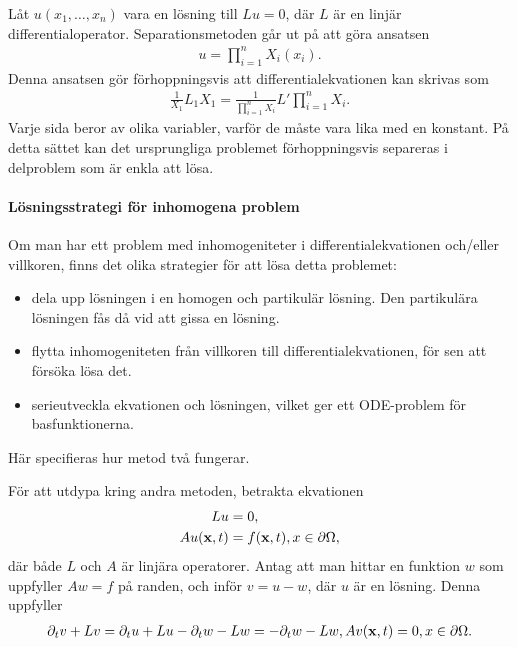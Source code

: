 Låt $u(x_{1}, \dots, x_{n})$ vara en lösning till $Lu = 0$, där $L$ är en linjär differentialoperator. Separationsmetoden går ut på att göra ansatsen
\begin{align*}
	u = \prod\limits_{i = 1}^{n}X_{i}(x_{i}).
\end{align*}
Denna ansatsen gör förhoppningsvis att differentialekvationen kan skrivas som
\begin{align*}
	\frac{1}{X_{1}}L_{1}X_{1} = \frac{1}{\prod\limits_{i = 1}^{n}X_{i}}L'\prod\limits_{i = 1}^{n}X_{i}.
\end{align*}
Varje sida beror av olika variabler, varför de måste vara lika med en konstant. På detta sättet kan det ursprungliga problemet förhoppningsvis separeras i delproblem som är enkla att lösa.

\paragraph{Lösningsstrategi för inhomogena problem}
Om man har ett problem med inhomogeniteter i differentialekvationen och/eller villkoren, finns det olika strategier för att lösa detta problemet:
\begin{itemize}
	\item dela upp lösningen i en homogen och partikulär lösning. Den partikulära lösningen fås då vid att gissa en lösning.
	\item flytta inhomogeniteten från villkoren till differentialekvationen, för sen att försöka lösa det.
	\item serieutveckla ekvationen och lösningen, vilket ger ett ODE-problem för basfunktionerna.
\end{itemize}
Här specifieras hur metod två fungerar.

För att utdypa kring andra metoden, betrakta ekvationen
\begin{align*}
	Lu            &= 0, \\
	Au(\vb{x}, t) &= f(\vb{x}, t), x\in\partial \Omega,
\end{align*}
där både $L$ och $A$ är linjära operatorer. Antag att man hittar en funktion $w$ som uppfyller $Aw = f$ på randen, och inför $v = u - w$, där $u$ är en lösning. Denna uppfyller
\begin{align*}
	\partial_{t}v + Lv = \partial_{t}u + Lu - \partial_{t}w - Lw = -\partial_{t}w - Lw,
	Av(\vb{x}, t) = 0, x\in\partial \Omega.
\end{align*}